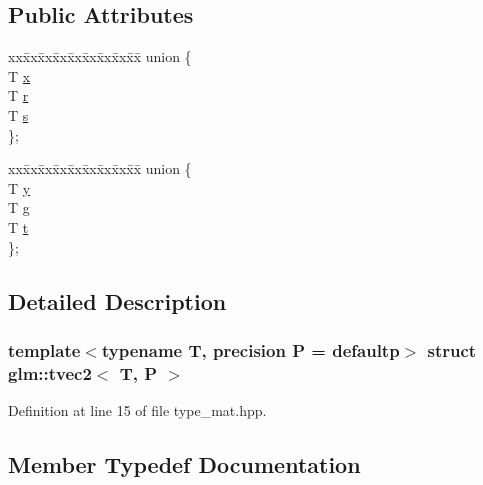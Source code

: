 \subsection*{Public Attributes}
\begin{DoxyCompactItemize}
\item 
\begin{tabbing}
xx\=xx\=xx\=xx\=xx\=xx\=xx\=xx\=xx\=\kill
union \{\\
\>T \mbox{\hyperlink{structglm_1_1tvec2_a129beaa64d75bb5414e164abd743ffc1}{x}}\\
\>T \mbox{\hyperlink{structglm_1_1tvec2_a1db700bfde11a9965a87c1e38c6f9fd6}{r}}\\
\>T \mbox{\hyperlink{structglm_1_1tvec2_abcad627ae6f435ce24b821f20bf4b3b3}{s}}\\
\}; \\

\end{tabbing}\item 
\begin{tabbing}
xx\=xx\=xx\=xx\=xx\=xx\=xx\=xx\=xx\=\kill
union \{\\
\>T \mbox{\hyperlink{structglm_1_1tvec2_a880f479f7348ba7fca07365711484d00}{y}}\\
\>T \mbox{\hyperlink{structglm_1_1tvec2_ade1907a682b74b6c095d1c2847b21e76}{g}}\\
\>T \mbox{\hyperlink{structglm_1_1tvec2_aa9f424d56c1c792efbd3ad3c7d1bfb9d}{t}}\\
\}; \\

\end{tabbing}\end{DoxyCompactItemize}


\subsection{Detailed Description}
\subsubsection*{template$<$typename T, precision P = defaultp$>$\newline
struct glm\+::tvec2$<$ T, P $>$}



Definition at line 15 of file type\+\_\+mat.\+hpp.



\subsection{Member Typedef Documentation}
\mbox{\label{structglm_1_1tvec2_add34b9138a842221f63186e25378d92e}} 
